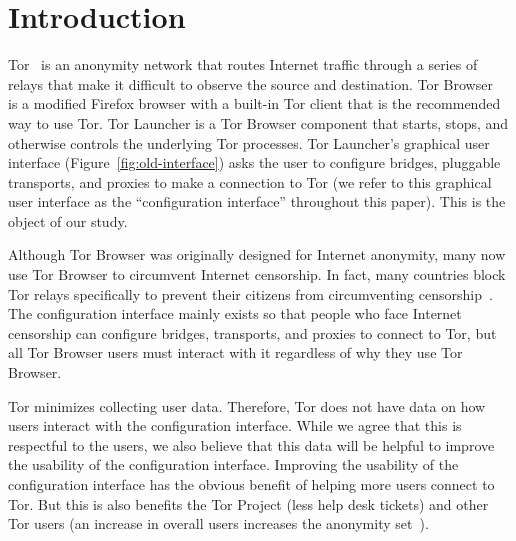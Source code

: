 \documentclass[USenglish,oneside,twocolumn]{article}
\begin{document}


\maketitle

\section{Introduction}

Tor~\cite{dingledine2004tor} is an anonymity network that routes Internet traffic through a series of relays 
that make it difficult to observe the source and destination. 
Tor Browser~\cite{torbrowser} is a modified Firefox browser with a built-in Tor client that
is the recommended way to use Tor. Tor Launcher is a Tor Browser component that
starts, stops, and otherwise controls the underlying Tor processes.
Tor Launcher's graphical user interface (Figure~\ref{fig:old-interface}) asks the user to configure
bridges, pluggable transports, and proxies to make a connection to Tor (we refer to this graphical user interface as the ``configuration interface'' throughout this paper). This is the object of our study. 

Although Tor Browser was originally designed for Internet anonymity, many now use Tor Browser to circumvent Internet censorship. In fact, many countries block Tor relays specifically to prevent their citizens from circumventing censorship~\cite{winter2012great}. The configuration interface mainly exists so that people who face Internet censorship can configure bridges, transports, and proxies to connect to Tor, but all Tor Browser users must interact with it regardless of why they use Tor Browser.

Tor minimizes collecting user data. Therefore, Tor does not have data on how users interact with the configuration interface. While we agree that this is respectful to the users, we also believe that this data will be helpful to improve the usability of the configuration interface. Improving the usability of the configuration interface has the obvious benefit of helping more users connect to Tor. But this is also benefits the Tor Project (less help desk tickets) and other Tor users (an increase in overall users increases the anonymity set~\cite{dingledine2006anonymity}). 
\end{document}
